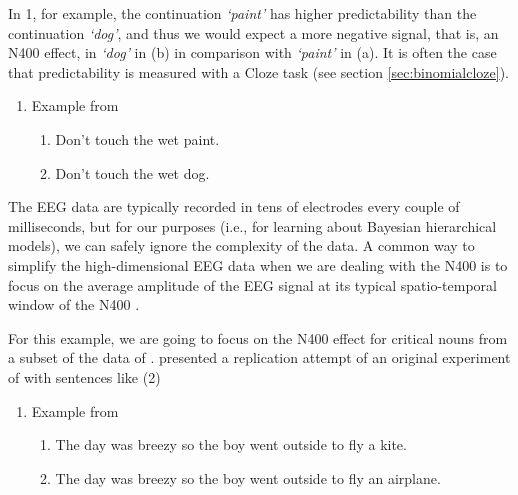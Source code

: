 \documentclass[12pt,]{krantz}
\providecommand{\tightlist}{%
  \setlength{\itemsep}{0pt}\setlength{\parskip}{0pt}}
\theoremstyle{definition}
\theoremstyle{definition}
\theoremstyle{definition}
\theoremstyle{remark}
\begin{document}
In 1, for example, the continuation \emph{`paint'} has higher predictability than the continuation \emph{`dog'}, and thus we would expect a more negative signal, that is, an N400 effect, in \emph{`dog'} in (b) in comparison with \emph{`paint'} in (a). It is often the case that predictability is measured with a Cloze task (see section \ref{sec:binomialcloze}).

\begin{enumerate}
\def\labelenumi{\arabic{enumi}.}
\tightlist
\item
  Example from \citet{kutasBrainPotentialsReading1984}

  \begin{enumerate}
  \def\labelenumii{\alph{enumii}.}
  \tightlist
  \item
    Don't touch the wet paint.
  \item
    Don't touch the wet dog.
  \end{enumerate}
\end{enumerate}

The EEG data are typically recorded in tens of electrodes every couple of milliseconds, but for our purposes (i.e., for learning about Bayesian hierarchical models), we can safely ignore the complexity of the data. A common way to simplify the high-dimensional EEG data when we are dealing with the N400 is to focus on the average amplitude of the EEG signal at its typical spatio-temporal window of the N400 \citep[see for example][]{frankERPResponseAmount2015}.

For this example, we are going to focus on the N400 effect for critical nouns from a subset of the data of \citet{nieuwlandLargescaleReplicationStudy2018}. \citet{nieuwlandLargescaleReplicationStudy2018} presented a replication attempt of an original experiment of \citet{delongProbabilisticWordPreactivation2005} with sentences like (2)

\begin{enumerate}
\def\labelenumi{\arabic{enumi}.}
\setcounter{enumi}{1}
\tightlist
\item
  Example from \citet{delongProbabilisticWordPreactivation2005}

  \begin{enumerate}
  \def\labelenumii{\alph{enumii}.}
  \tightlist
  \item
    The day was breezy so the boy went outside to fly a kite.
  \item
    The day was breezy so the boy went outside to fly an airplane.
  \end{enumerate}
\end{enumerate}
\end{document}
